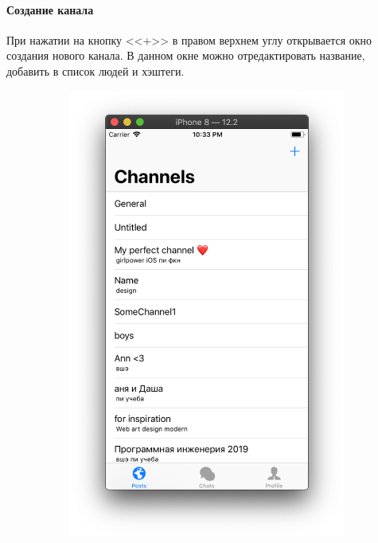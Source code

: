 \documentclass[a4paper,12pt]{article}
\begin{document}
	\paragraph{Создание канала\\}
	При нажатии на кнопку <<+>> в правом верхнем углу открывается окно создания нового канала. В данном окне можно отредактировать название, добавить в список людей и хэштеги. 
	\begin{figure}[h!]
		\centering
		\begin{subfigure}[b]{0.3\linewidth}
			\includegraphics[width=\linewidth]{../includes/pmi/channel_list.png}
		\end{subfigure}

\end{figure}
\end{document}

